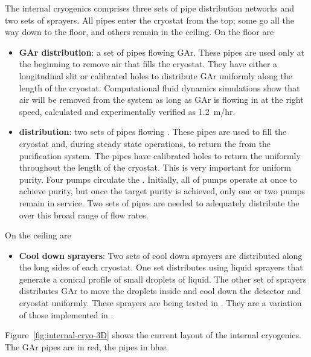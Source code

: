 \label{sec:fdsp-tc-internal-cryo}

The internal cryogenics comprises three sets of pipe distribution networks and two sets of sprayers. All pipes enter the cryostat from the top; some go all the way down to the floor, and others remain in the ceiling. On the floor are
\begin{itemize}
\setlength\itemsep{1mm}
\setlength{\parsep}{1mm}
\setlength{\itemsep}{-5mm}
\item \textbf{GAr distribution}: a set of pipes flowing GAr. These pipes are used only at the beginning to remove air that fills the cryostat. They have either a longitudinal slit or calibrated holes to distribute GAr uniformly along the length of the cryostat. Computational fluid dynamics simulations show that air will be removed from the system as long as GAr is flowing in at the right speed, calculated and experimentally verified as \SI{1.2}{m/hr}.


\item \textbf{ distribution}: two sets of pipes flowing . These pipes are used to fill the cryostat and, during steady state operations, to return the  from the purification system. The pipes have calibrated holes to return the  uniformly throughout the length of the cryostat. This is very important for uniform purity. Four pumps circulate the . Initially, all of pumps operate at once to achieve purity, but once the target purity is achieved, only one or two pumps remain in service. Two sets of pipes are needed to adequately distribute the  over this broad range of flow rates.
\end{itemize}

On the ceiling are

\begin{itemize}
\setlength\itemsep{1mm}
\setlength{\parsep}{1mm}
\setlength{\itemsep}{-5mm}
\item \textbf{Cool down sprayers}: Two sets of cool down sprayers are distributed along the long sides of each cryostat. One set distributes  using liquid sprayers that generate a conical profile of small droplets of liquid. The other set of sprayers distributes GAr to move the  droplets inside and cool down the detector and cryostat uniformly. These sprayers are being tested in . They are a variation of those implemented in .
\end{itemize}

Figure~\ref{fig:internal-cryo-3D} shows the current layout of the internal cryogenics. 
The GAr pipes are in red, the  pipes in blue.

